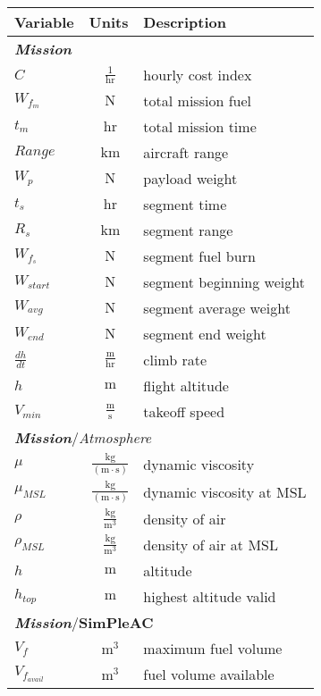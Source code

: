 \begin{footnotesize}
\begin{longtable}{lcl}
\toprule
Variable & Units & Description \\ \midrule
\multicolumn{3}{l}{\textbf{\textit{Mission}}} \\
$C$ & $~\mathrm{\tfrac{1}{hr}}$ & hourly cost index \\
$W_{f_{m}}$ & $~\mathrm{N}$ & total mission fuel \\
$t_m$ & $~\mathrm{hr}$ & total mission time \\
$Range$ & $~\mathrm{km}$ & aircraft range \\
$W_p$ & $~\mathrm{N}$ & payload weight \\
$t_s$ & $~\mathrm{hr}$ & segment time \\
$R_s$ & $~\mathrm{km}$ & segment range \\
$W_{f_s}$ & $~\mathrm{N}$ & segment fuel burn \\
$W_{start}$ & $~\mathrm{N}$ & segment beginning weight \\
$W_{avg}$ & $~\mathrm{N}$ & segment average weight \\
$W_{end}$ & $~\mathrm{N}$ & segment end weight \\
$\frac{dh}{dt}$ & $~\mathrm{\tfrac{m}{hr}}$ & climb rate \\
$h$ & $~\mathrm{m}$ & flight altitude \\
$V_{min}$ & $~\mathrm{\tfrac{m}{s}}$ & takeoff speed \\
\hline
\multicolumn{3}{l}{\textbf{\textit{Mission}}/\textit{Atmosphere}} \\
$\mu$ & $~\mathrm{\tfrac{kg}{\left(m\cdot s\right)}}$ & dynamic viscosity \\
$\mu_{MSL}$ & $~\mathrm{\tfrac{kg}{\left(m\cdot s\right)}}$ & dynamic viscosity at MSL \\
$\rho$ & $~\mathrm{\tfrac{kg}{m^{3}}}$ & density of air \\
$\rho_{MSL}$ & $~\mathrm{\tfrac{kg}{m^{3}}}$ & density of air at MSL \\
$h$ & $~\mathrm{m}$ & altitude \\
$h_{top}$ & $~\mathrm{m}$ & highest altitude valid \\
\hline
\multicolumn{3}{l}{\textbf{\textit{Mission}}/\textbf{SimPleAC}} \\
$V_f$ & $~\mathrm{m^{3}}$ & maximum fuel volume \\
$V_{f_{avail}}$ & $~\mathrm{m^{3}}$ & fuel volume available \\

\end{longtable}
\end{footnotesize}
